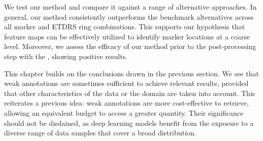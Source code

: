 We test our method and compare it against a range of alternative approaches. In general, our method consistently outperforms the benchmark alternatives across all marker and ETDRS ring combinations. This supports our hypothesis that feature maps can be effectively utilized to identify marker locations at a coarse level. Moreover, we assess the efficacy of our method prior to the post-processing step with the , showing positive results.

This chapter builds on the conclusions drawn in the previous section. We see that weak annotations are sometimes sufficient to achieve relevant results, provided that other characteristics of the data or the domain are taken into account. This reiterates a previous idea: weak annotations are more cost-effective to retrieve, allowing an equivalent budget to access a greater quantity. Their significance should not be disdained, as deep learning models benefit from the exposure to a diverse range of data samples that cover a broad distribution.